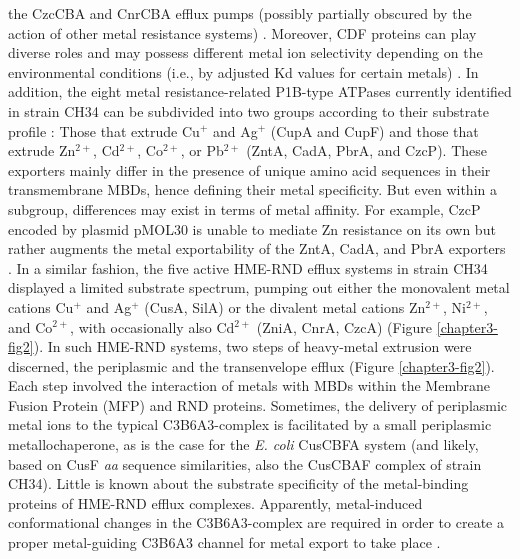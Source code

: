 the CzcCBA and CnrCBA efflux pumps (possibly partially obscured by the action of other metal resistance systems) \citep{munkelt2004chromosomally}. Moreover, CDF proteins can play diverse roles and may possess different metal ion selectivity depending on the environmental conditions (i.e., by adjusted Kd values for certain metals) \citep{barber2017transition}. In addition, the eight metal resistance-related P1B-type ATPases currently identified in strain CH34 can be subdivided into two groups according to their substrate profile \citep{nies2016biological}: Those that extrude Cu$^+$ and Ag$^+$ (CupA and CupF) and those that extrude Zn$^{2+}$, Cd$^{2+}$, Co$^{2+}$, or Pb$^{2+}$ (ZntA, CadA, PbrA, and CzcP). These exporters mainly differ in the presence of unique amino acid sequences in their transmembrane MBDs, hence defining their metal specificity. But even within a subgroup, differences may exist in terms of metal affinity. For example, CzcP encoded by plasmid pMOL30 is unable to mediate Zn resistance on its own but rather augments the metal exportability of the ZntA, CadA, and PbrA exporters \citep{scherer2009czcp}. In a similar fashion, the five active HME-RND efflux systems in strain CH34 displayed a limited substrate spectrum, pumping out either the monovalent metal cations Cu$^+$ and Ag$^+$ (CusA, SilA) or the divalent metal cations Zn$^{2+}$, Ni$^{2+}$, and Co$^{2+}$, with occasionally also Cd$^{2+}$ (ZniA, CnrA, CzcA) \citep{nies2016biological} (Figure \ref{chapter3-fig2}). In such HME-RND systems, two steps of heavy-metal extrusion were discerned, the periplasmic and the transenvelope efflux (Figure \ref{chapter3-fig2}). Each step involved the interaction of metals with MBDs within the Membrane Fusion Protein (MFP) and RND proteins. Sometimes, the delivery of periplasmic metal ions to the typical C3B6A3-complex is facilitated by a small periplasmic metallochaperone, as is the case for the \textit{E. coli} CusCBFA system \citep{delmar2014bacterial} (and likely, based on CusF \textit{aa} sequence similarities, also the CusCBAF complex of strain CH34). Little is known about the substrate specificity of the metal-binding proteins of HME-RND efflux complexes. Apparently, metal-induced conformational changes in the C3B6A3-complex are required in order to create a proper metal-guiding C3B6A3 channel for metal export to take place \citep{kim2011switch,de2010metal,long2012structure,pak2013structures}.

